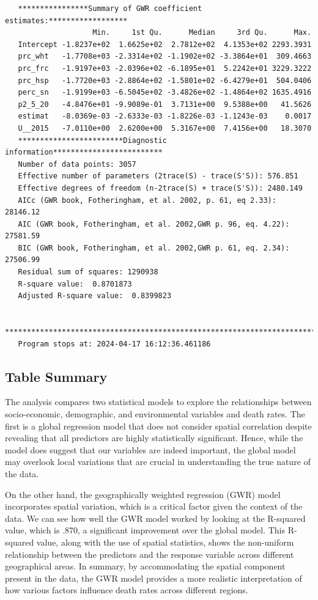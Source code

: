 \documentclass[
]{article}
\begin{document}
\begin{verbatim}
   ****************Summary of GWR coefficient estimates:******************
                    Min.     1st Qu.      Median     3rd Qu.      Max.
   Intercept -1.8237e+02  1.6625e+02  2.7812e+02  4.1353e+02 2293.3931
   prc_wht   -1.7708e+03 -2.3314e+02 -1.1902e+02 -3.3864e+01  309.4663
   prc_frc   -1.9197e+03 -2.0396e+02 -6.1895e+01  5.2242e+01 3229.3222
   prc_hsp   -1.7720e+03 -2.8864e+02 -1.5801e+02 -6.4279e+01  504.0406
   perc_sn   -1.9199e+03 -6.5045e+02 -3.4826e+02 -1.4864e+02 1635.4916
   p2_5_20   -4.8476e+01 -9.9089e-01  3.7131e+00  9.5388e+00   41.5626
   estimat   -8.0369e-03 -2.6333e-03 -1.8226e-03 -1.1243e-03    0.0017
   U__2015   -7.0110e+00  2.6200e+00  5.3167e+00  7.4156e+00   18.3070
   ************************Diagnostic information*************************
   Number of data points: 3057 
   Effective number of parameters (2trace(S) - trace(S'S)): 576.851 
   Effective degrees of freedom (n-2trace(S) + trace(S'S)): 2480.149 
   AICc (GWR book, Fotheringham, et al. 2002, p. 61, eq 2.33): 28146.12 
   AIC (GWR book, Fotheringham, et al. 2002,GWR p. 96, eq. 4.22): 27581.59 
   BIC (GWR book, Fotheringham, et al. 2002,GWR p. 61, eq. 2.34): 27506.99 
   Residual sum of squares: 1290938 
   R-square value:  0.8701873 
   Adjusted R-square value:  0.8399823 

   ***********************************************************************
   Program stops at: 2024-04-17 16:12:36.461186 
\end{verbatim}

\subsection{Table Summary}\label{table-summary}

The analysis compares two statistical models to explore the
relationships between socio-economic, demographic, and environmental
variables and death rates. The first is a global regression model that
does not consider spatial correlation despite revealing that all
predictors are highly statistically significant. Hence, while the model
does suggest that our variables are indeed important, the global model
may overlook local variations that are crucial in understanding the true
nature of the data.

On the other hand, the geographically weighted regression (GWR) model
incorporates spatial variation, which is a critical factor given the
context of the data. We can see how well the GWR model worked by looking
at the R-squared value, which is .870, a significant improvement over
the global model. This R-squared value, along with the use of spatial
statistics, shows the non-uniform relationship between the predictors
and the response variable across different geographical areas. In
summary, by accommodating the spatial component present in the data, the
GWR model provides a more realistic interpretation of how various
factors influence death rates across different regions.
\end{document}
